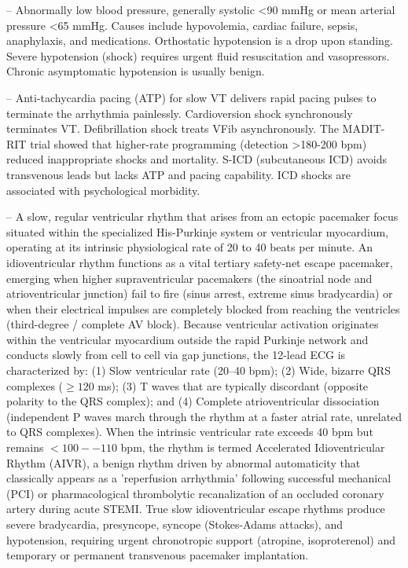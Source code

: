 -- Abnormally low blood pressure, generally systolic <90 mmHg or mean arterial pressure <65 mmHg. Causes include hypovolemia, cardiac failure, sepsis, anaphylaxis, and medications. Orthostatic hypotension is a drop upon standing. Severe hypotension (shock) requires urgent fluid resuscitation and vasopressors. Chronic asymptomatic hypotension is usually benign.

-- Anti-tachycardia pacing (ATP) for slow VT delivers rapid pacing pulses to terminate the arrhythmia painlessly. Cardioversion shock synchronously terminates VT. Defibrillation shock treats VFib asynchronously. The MADIT-RIT trial showed that higher-rate programming (detection >180-200 bpm) reduced inappropriate shocks and mortality. S-ICD (subcutaneous ICD) avoids transvenous leads but lacks ATP and pacing capability. ICD shocks are associated with psychological morbidity.

-- A slow, regular ventricular rhythm that arises from an ectopic pacemaker focus situated within the specialized His-Purkinje system or ventricular myocardium, operating at its intrinsic physiological rate of 20 to 40 beats per minute. An idioventricular rhythm functions as a vital tertiary safety-net escape pacemaker, emerging when higher supraventricular pacemakers (the sinoatrial node and atrioventricular junction) fail to fire (sinus arrest, extreme sinus bradycardia) or when their electrical impulses are completely blocked from reaching the ventricles (third-degree / complete AV block). Because ventricular activation originates within the ventricular myocardium outside the rapid Purkinje network and conducts slowly from cell to cell via gap junctions, the 12-lead ECG is characterized by: (1) Slow ventricular rate (20--40 bpm); (2) Wide, bizarre QRS complexes ($\ge 120$ ms); (3) T waves that are typically discordant (opposite polarity to the QRS complex); and (4) Complete atrioventricular dissociation (independent P waves march through the rhythm at a faster atrial rate, unrelated to QRS complexes). When the intrinsic ventricular rate exceeds 40 bpm but remains $<100--110$ bpm, the rhythm is termed Accelerated Idioventricular Rhythm (AIVR), a benign rhythm driven by abnormal automaticity that classically appears as a 'reperfusion arrhythmia' following successful mechanical (PCI) or pharmacological thrombolytic recanalization of an occluded coronary artery during acute STEMI. True slow idioventricular escape rhythms produce severe bradycardia, presyncope, syncope (Stokes-Adams attacks), and hypotension, requiring urgent chronotropic support (atropine, isoproterenol) and temporary or permanent transvenous pacemaker implantation.

